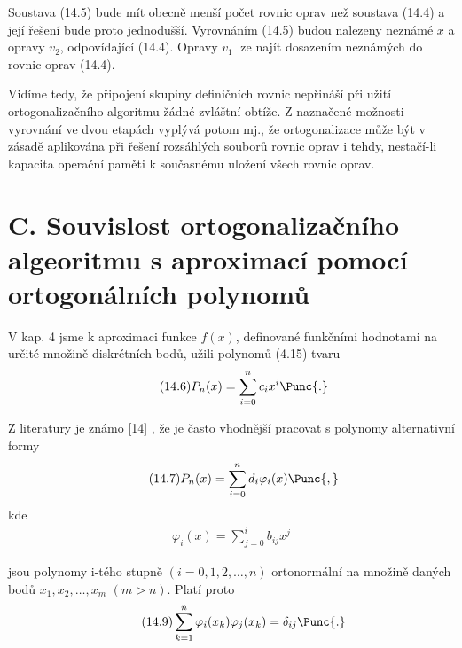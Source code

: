 \noindent
Soustava  (14.5) bude mít obecně menší počet rovnic oprav
než soustava (14.4) a její řešení bude proto jednodušší.  Vyrovnáním
(14.5) budou nalezeny neznámé $x$ a opravy $v_2$, odpovídající
(14.4). Opravy $v_1$ lze najít dosazením neznámých do rovnic oprav
(14.4).

Vidíme tedy, že připojení skupiny definičních rovnic
nepřináší při užití ortogonalizačního algoritmu žádné zvláštní
obtíže. Z naznačené možnosti vyrovnání ve dvou etapách vyplývá
potom mj., že ortogonalizace může být v zásadě aplikována při
řešení rozsáhlých souborů rovnic oprav i tehdy, nestačí-li
kapacita operační paměti k současnému uložení všech rovnic oprav.


\section*{C. Souvislost ortogonalizačního algeoritmu s aproximací pomocí
ortogonálních polynomů}

V kap. 4 jsme k aproximaci funkce $f(x)$, definované funkčními
hodnotami na určité množině diskrétních bodů, užili polynomů
(4.15) tvaru
%
\begin{align*}
\tag{14.6}
P_n(x) = \sum_{i=0}^n c_i x^i\Punc{.}
\end{align*}

\noindent
Z literatury je známo [14] , že je často vhodnější pracovat s
polynomy alternativní formy
%
\begin{align*}
\tag{14.7}
P_n(x) = \sum_{i=0}^n d_i \varphi_i(x)\Punc{,}
\end{align*}
%
kde
%
\begin{align*}
\tag{14.8}
\varphi_i(x) = \sum_{j=0}^i b_{ij} x^j
\end{align*}

\noindent
jsou polynomy i-tého stupně $(i=0,1,2,\ldots,n)$ ortonormální na
množině daných bodů $x_1, x_2,\ldots, x_m$ $(m>n)$. Platí proto
%
\begin{align*}
\tag{14.9}
\sum_{k=1}^n \varphi_i(x_k) \varphi_j(x_k) = \delta_{ij} \Punc{.}
\end{align*}


